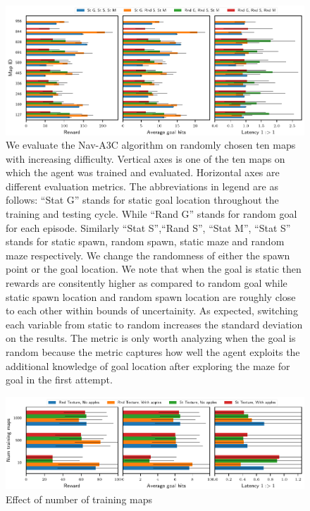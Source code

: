 \begin{figure}%
  \vspace{-4em}%
  \includegraphics[width=\linewidth]{images/plot_summary_bar_plots.pdf}%
  \vspace{-1em}%
  \caption{We evaluate the Nav-A3C\cite{MiPaViICLR2017} algorithm on randomly chosen ten maps with increasing difficulty. Vertical axes is one of the ten maps on which the agent was trained and evaluated. Horizontal axes are different evaluation metrics.
    The abbreviations in legend are as follows: ``Stat G'' stands for
    static goal location throughout the training and testing cycle.
    While ``Rand G'' stands for random goal for each episode.
    Similarly ``Stat S'',``Rand S'', ``Stat M'', ``Stat S''  stands for static spawn, random spawn, static maze and random maze respectively.
    We change the randomness of either the spawn point or the goal location. We note that when the goal is static then rewards are consitently higher as compared to random goal while static spawn location and random spawn location are roughly close to each other within bounds of uncertainity. As expected, switching each variable from static to random increases the standard deviation on the results.
    The \LatencyOneGtOne metric is only worth analyzing when the goal is random because the metric captures how well the agent exploits the additional knowledge of goal location after exploring the maze for goal in the first attempt.}%
\label{fig:latency-goal-reward}%
\end{figure}

\begin{figure}%
  \includegraphics[width=\linewidth]{images/plot_ntrain_summary.pdf}%
  \vspace{-1em}%
  \caption{Effect of number of training maps}
  \label{fig:num-training-maps}
\end{figure}

